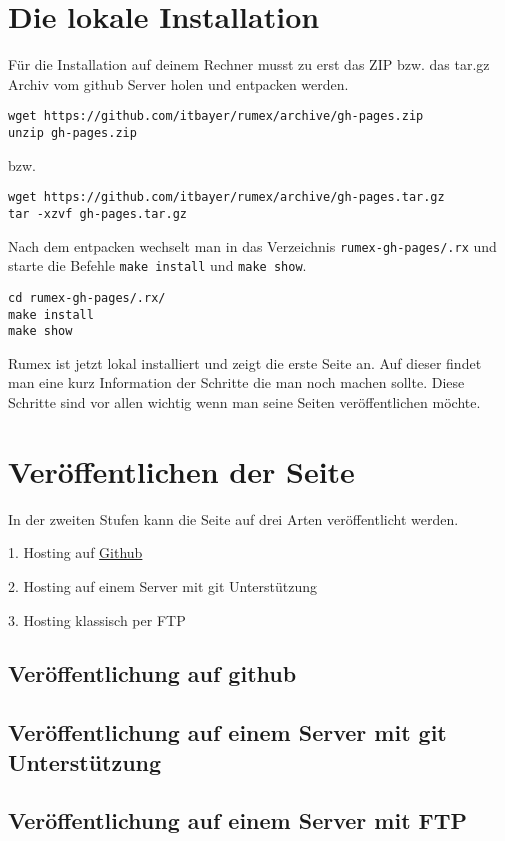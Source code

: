 \label{sec:die-lokale-installation}
\section{Die lokale Installation}

Für die Installation auf deinem Rechner musst 
zu erst das ZIP bzw. das tar.gz Archiv 
vom github Server holen und entpacken werden.

\begin{verbatim}
wget https://github.com/itbayer/rumex/archive/gh-pages.zip
unzip gh-pages.zip
\end{verbatim}

bzw.

\begin{verbatim}
wget https://github.com/itbayer/rumex/archive/gh-pages.tar.gz
tar -xzvf gh-pages.tar.gz
\end{verbatim}

Nach dem entpacken wechselt man in das Verzeichnis
\texttt{rumex-gh-pages/.rx} und starte
die Befehle \texttt{make install} und \texttt{make show}.

\begin{verbatim}
cd rumex-gh-pages/.rx/
make install
make show
\end{verbatim}

Rumex ist jetzt lokal installiert und zeigt die erste Seite an.
Auf dieser findet man eine kurz Information der Schritte die
man noch machen sollte. 
Diese Schritte sind vor allen wichtig wenn man seine Seiten
veröffentlichen möchte.



\label{sec:veroeffentlichen-der-seite}
\section{Veröffentlichen der Seite}

In der zweiten Stufen kann die Seite auf drei
Arten veröffentlicht werden.

1. Hosting auf \href{http://www.github.com}{Github}

2. Hosting auf einem Server mit git Unterstützung

3. Hosting klassisch per FTP


\label{ssec:installation-github}
\subsection{Veröffentlichung auf github}


\label{ssec:installation-gitserver}
\subsection{Veröffentlichung auf einem Server mit git Unterstützung}


\label{ssec:installation-ftpserver}
\subsection{Veröffentlichung auf einem Server mit FTP}



